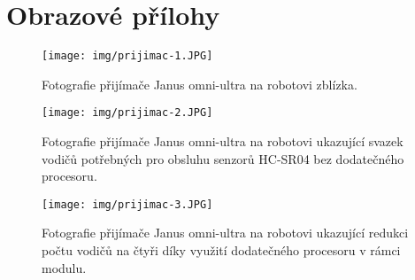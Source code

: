 \chapter{Obrazové přílohy}

\begin{figure}[htbp]
    \centering
    \texttt{[image: img/prijimac-1.JPG]}
    \caption{Fotografie přijímače Janus omni-ultra na robotovi zblízka.}
    \label{fig:prijimac1}
\end{figure}

\begin{figure}[htbp]
    \centering
    \texttt{[image: img/prijimac-2.JPG]}
    \caption{Fotografie přijímače Janus omni-ultra na robotovi ukazující svazek vodičů potřebných pro obsluhu senzorů HC-SR04 bez dodatečného procesoru.}
    \label{fig:prijimac2}
\end{figure}

\begin{figure}[htbp]
    \centering
    \texttt{[image: img/prijimac-3.JPG]}
    \caption{Fotografie přijímače Janus omni-ultra na robotovi ukazující redukci počtu vodičů na čtyři díky využití dodatečného procesoru v rámci modulu.}
    \label{fig:prijimac3}
\end{figure}